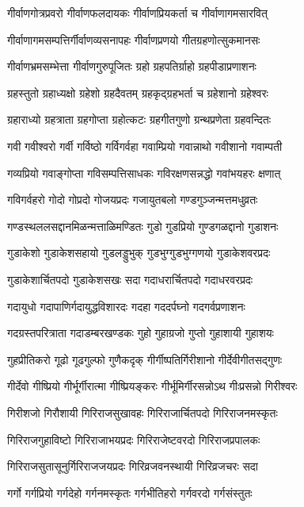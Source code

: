 \twolineshloka
{गीर्वाणगोत्रप्रवरो गीर्वाणफलदायकः}%
{गीर्वाणप्रियकर्ता च गीर्वाणागमसारवित्}%

\twolineshloka
{गीर्वाणागमसम्पत्तिर्गीर्वाणव्यसनापहः}%
{गीर्वाणप्रणयो गीतग्रहणोत्सुकमानसः}%

\twolineshloka
{गीर्वाणभ्रमसम्भेत्ता गीर्वाणगुरुपूजितः}%
{ग्रहो ग्रहपतिर्ग्राहो ग्रहपीडाप्रणाशनः}%

\twolineshloka
{ग्रहस्तुतो ग्रहाध्यक्षो ग्रहेशो ग्रहदैवतम्}%
{ग्रहकृद्ग्रहभर्ता च ग्रहेशानो ग्रहेश्वरः}%

\twolineshloka
{ग्रहाराध्यो ग्रहत्राता ग्रहगोप्ता ग्रहोत्कटः}%
{ग्रहगीतगुणो ग्रन्थप्रणेता ग्रहवन्दितः}%

\twolineshloka
{गवी गवीश्वरो गर्वी गर्विष्ठो गर्विगर्वहा}%
{गवाम्प्रियो गवान्नाथो गवीशानो गवाम्पती}%

\twolineshloka
{गव्यप्रियो गवाङ्गोप्ता गविसम्पत्तिसाधकः}%
{गविरक्षणसन्नद्धो गवांभयहरः क्षणात्}%

\twolineshloka
{गविगर्वहरो गोदो गोप्रदो गोजयप्रदः}%
{गजायुतबलो गण्डगुञ्जन्मत्तमधुव्रतः}%

\twolineshloka
{गण्डस्थललसद्दानमिळन्मत्ताळिमण्डितः}%
{गुडो गुडप्रियो गुण्डगळद्दानो गुडाशनः}%

\twolineshloka
{गुडाकेशो गुडाकेशसहायो गुडलड्डुभुक्}%
{गुडभुग्गुडभुग्गणयो गुडाकेशवरप्रदः}%

\twolineshloka
{गुडाकेशार्चितपदो गुडाकेशसखः सदा}%
{गदाधरार्चितपदो गदाधरवरप्रदः}%

\twolineshloka
{गदायुधो गदापाणिर्गदायुद्धविशारदः}%
{गदहा गददर्पघ्नो गदगर्वप्रणाशनः}%

\twolineshloka
{गदग्रस्तपरित्राता गदाडम्बरखण्डकः}%
{गुहो गुहाग्रजो गुप्तो गुहाशायी गुहाशयः}%

\twolineshloka
{गुहप्रीतिकरो गूढो गूढगुल्फो गुणैकदृक्}%
{गीर्गीष्पतिर्गिरीशानो गीर्देवीगीतसद्गुणः}%

\twolineshloka
{गीर्देवो गीष्प्रियो गीर्भूर्गीरात्मा गीष्प्रियङ्करः}%
{गीर्भूमिर्गीरसन्नोऽथ गीःप्रसन्नो गिरीश्वरः}%

\twolineshloka
{गिरीशजो गिरौशायी गिरिराजसुखावहः}%
{गिरिराजार्चितपदो गिरिराजनमस्कृतः}%

\twolineshloka
{गिरिराजगुहाविष्टो गिरिराजाभयप्रदः}%
{गिरिराजेष्टवरदो गिरिराजप्रपालकः}%

\twolineshloka
{गिरिराजसुतासूनुर्गिरिराजजयप्रदः}%
{गिरिव्रजवनस्थायी गिरिव्रजचरः सदा}%

\twolineshloka
{गर्गो गर्गप्रियो गर्गदेहो गर्गनमस्कृतः}%
{गर्गभीतिहरो गर्गवरदो गर्गसंस्तुतः}%

